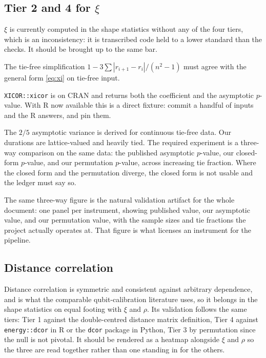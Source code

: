 \documentclass[11pt,a4paper]{article}
\begin{document}
\subsection{Tier 2 and 4 for \texorpdfstring{$\xi$}{xi}}

$\xi$ is currently computed in the shape statistics without any of the four tiers, which
is an inconsistency: it is transcribed code held to a lower standard than the checks. It
should be brought up to the same bar.

\begin{description}[leftmargin=1.8em,itemsep=3pt]
\item[Tier 1.] The tie-free simplification $1 - 3\sum|r_{i+1}-r_i|/(n^2-1)$ must agree
with the general form \eqref{eq:xi} on tie-free input.
\item[Tier 4.] \texttt{XICOR::xicor} is on CRAN and returns both the coefficient and the
asymptotic $p$-value. With R now available this is a direct fixture: commit a handful of
inputs and the R answers, and pin them.
\item[Tier 3, and this is the one that matters here.] The $2/5$ asymptotic variance is
derived for continuous tie-free data. Our durations are lattice-valued and heavily tied.
The required experiment is a three-way comparison on the same data: the published
asymptotic $p$-value, our closed-form $p$-value, and our permutation $p$-value, across
increasing tie fraction. Where the closed form and the permutation diverge, the closed
form is not usable and the ledger must say so.
\end{description}

\noindent
The same three-way figure is the natural validation artifact for the whole document:
one panel per instrument, showing published value, our asymptotic value, and our
permutation value, with the sample sizes and tie fractions the project actually operates
at. That figure is what licenses an instrument for the pipeline.

\subsection{Distance correlation}

Distance correlation is symmetric and consistent against arbitrary dependence, and is
what the comparable qubit-calibration literature uses, so it belongs in the shape
statistics on equal footing with $\xi$ and $\rho$. Its validation follows the same tiers:
Tier 1 against the double-centred distance matrix definition, Tier 4 against
\texttt{energy::dcor} in R or the \texttt{dcor} package in Python, Tier 3 by permutation
since the null is not pivotal. It should be rendered as a heatmap alongside $\xi$ and
$\rho$ so the three are read together rather than one standing in for the others.
\end{document}
